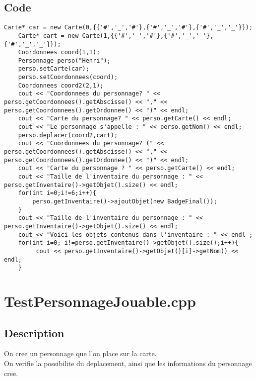         \subsection{Code}
\begin{lstlisting}
Carte* car = new Carte(0,{{'#','_','#'},{'#','_','#'},{'#','_','_'}});
	Carte* cart = new Carte(1,{{'#','_','#'},{'#','_','_'},{'#','_','_'}});
	Coordonnees coord(1,1);
	Personnage perso("Henri");
	perso.setCarte(car);
	perso.setCoordonnees(coord);
	Coordonnees coord2(2,1);
	cout << "Coordonnees du personnage? " << perso.getCoordonnees().getAbscisse() << "," << perso.getCoordonnees().getOrdonnee() << ")" << endl;
	cout << "Carte du personnage? " << perso.getCarte() << endl;
	cout << "Le personnage s'appelle : " << perso.getNom() << endl;
	perso.deplacer(coord2,cart);
	cout << "Coordonnees du personnage? (" << perso.getCoordonnees().getAbscisse() << "," << perso.getCoordonnees().getOrdonnee() << ")" << endl;
	cout << "Carte du personnage ? " << perso.getCarte() << endl;
	cout << "Taille de l'inventaire du personnage : " << perso.getInventaire()->getObjet().size() << endl;
	for(int i=0;i!=6;i++){
		perso.getInventaire()->ajoutObjet(new BadgeFinal());
	}
	cout << "Taille de l'inventaire du personnage : " << perso.getInventaire()->getObjet().size() << endl; 
	cout << "Voici les objets contenus dans l'inventaire : " << endl ;
	for(int i=0; i!=perso.getInventaire()->getObjet().size();i++){
		 cout << perso.getInventaire()->getObjet()[i]->getNom() << endl;
	}		
	\end{lstlisting}
    \section{TestPersonnageJouable.cpp}
        \subsection{Description}
            On cree un personnage que l'on place sur la carte.\\
            On verifie la possibilite du deplacement, ainsi que les informations du personnage cree.
